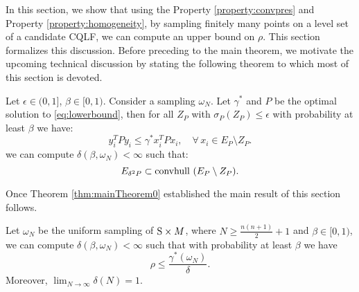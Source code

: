 In this section, we show that using the Property \ref{property:convpres} and Property \ref{property:homogeneity}, by sampling finitely many points on a level set of a candidate CQLF, we can compute an upper bound on $\rho$. This section formalizes this discussion. Before preceding to the main theorem, we motivate the upcoming technical discussion by stating the following theorem to which most of this section is devoted.

\begin{theorem} \label{thm:mainTheorem0} Let $\epsilon \in (0,1]$, $\beta \in [0,1)$. Consider a sampling $\omega_N$. Let $\gamma^*$ and $P$ be the optimal solution to \eqref{eq:lowerbound}, then for all $Z_P$ with $\sigma_P(Z_P)\leq \epsilon$ with probability at least $\beta$ we have:
\begin{equation*} y_i^TPy_i \leq \gamma^*x_i^TPx_i, \quad \forall\, x_i \in E_P \setminus Z_P.\end{equation*}
we can compute $\delta(\beta, \omega_N) < \infty$ such that:
\begin{equation}\label{eqn:contraction}E_{\delta^2P} \subset  \mbox{convhull } (E_P \setminus Z_P).
\end{equation}
\end{theorem}

Once Theorem \ref{thm:mainTheorem0} established the main result of this section follows.

\begin{theorem} \label{thm:mainTheorem} Let $\omega_N$ be the uniform sampling of $\text{S} \times M$, where $N \geq \frac{n(n+1)}{2}+1$ and $\beta \in [0,1)$, we can compute $\delta(\beta, \omega_N) < \infty$ such that with probability at least $\beta$ we have $$\rho \leq \frac{\gamma^*(\omega_N)}{\delta}.$$ Moreover, $\lim_{N \to \infty} \delta(N) = 1$.
\end{theorem}

